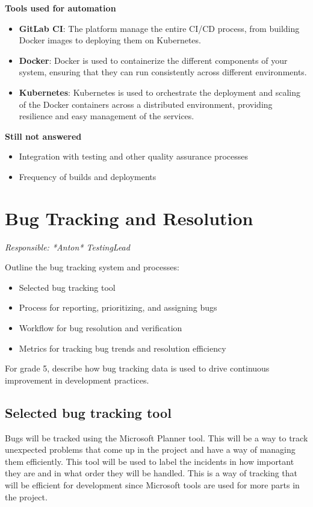 \documentclass{article}
\begin{document}
\textbf{Tools used for automation}
\begin{itemize}
    \item \textbf{GitLab CI}: The platform manage the entire CI/CD process, from building Docker images to deploying them on Kubernetes.
    \item \textbf{Docker}: Docker is used to containerize the different components of your system, ensuring that they can run consistently across different environments.
    \item \textbf{Kubernetes}: Kubernetes is used to orchestrate the deployment and scaling of the Docker containers across a distributed environment, providing resilience and easy management of the services.
\end{itemize}
\vspace{1 em}

\textbf{Still not answered}
\begin{itemize}
    \item Integration with testing and other quality assurance processes
    \item Frequency of builds and deployments
\end{itemize}





\newpage
\section{Bug Tracking and Resolution}
\textit{Responsible: *Anton* TestingLead}

Outline the bug tracking system and processes:

\begin{itemize}
    \item Selected bug tracking tool
    \item Process for reporting, prioritizing, and assigning bugs
    \item Workflow for bug resolution and verification
    \item Metrics for tracking bug trends and resolution efficiency
\end{itemize}

For grade 5, describe how bug tracking data is used to drive continuous improvement in development practices.

\subsection{Selected bug tracking tool} 
Bugs will be tracked using the Microsoft Planner tool. This will be a way to track unexpected problems that come up in the project and have a way of managing them efficiently. This tool will be used to label the incidents in how important they are and in what order they will be handled. This is a way of tracking that will be efficient for development since Microsoft tools are used for more parts in the project. 
\end{document}
